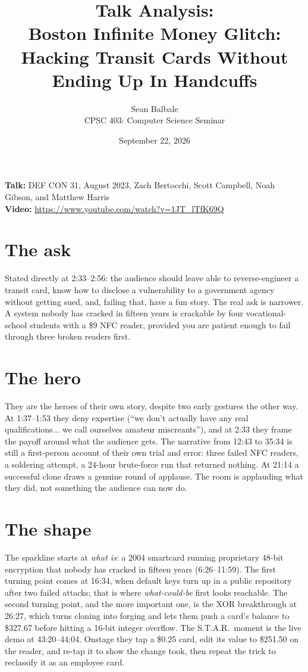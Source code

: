 \documentclass[11pt]{article}
\title{\vspace{-2em}Talk Analysis: \\ \large Boston Infinite Money Glitch: Hacking Transit Cards Without Ending Up In Handcuffs}
\author{Sean Balbale \\ CPSC 403: Computer Science Seminar}
\date{September 22, 2026}
\begin{document}
\maketitle
\vspace{-1.5em}

\noindent\textbf{Talk:} DEF CON 31, August 2023, Zach Bertocchi, Scott Campbell, Noah Gibson, and Matthew Harris \\
\textbf{Video:} \url{https://www.youtube.com/watch?v=1JT_lTfK69Q}

\section{The ask}
Stated directly at 2:33--2:56: the audience should leave able to reverse-engineer a transit card, know how to disclose a vulnerability to a government agency without getting sued, and, failing that, have a fun story. The real ask is narrower. A system nobody has cracked in fifteen years is crackable by four vocational-school students with a \$9 NFC reader, provided you are patient enough to fail through three broken readers first.

\section{The hero}
They are the heroes of their own story, despite two early gestures the other way. At 1:37--1:53 they deny expertise (``we don't actually have any real qualifications... we call ourselves amateur miscreants''), and at 2:33 they frame the payoff around what the audience gets. The narrative from 12:43 to 35:34 is still a first-person account of their own trial and error: three failed NFC readers, a soldering attempt, a 24-hour brute-force run that returned nothing. At 21:14 a successful clone draws a genuine round of applause. The room is applauding what they did, not something the audience can now do.

\section{The shape}
The sparkline starts at \emph{what is}: a 2004 smartcard running proprietary 48-bit encryption that nobody has cracked in fifteen years (6:26--11:59). The first turning point comes at 16:34, when default keys turn up in a public repository after two failed attacks; that is where \emph{what-could-be} first looks reachable. The second turning point, and the more important one, is the XOR breakthrough at 26:27, which turns cloning into forging and lets them push a card's balance to \$327.67 before hitting a 16-bit integer overflow. The S.T.A.R.\ moment is the live demo at 43:20--44:04. Onstage they tap a \$0.25 card, edit its value to \$251.50 on the reader, and re-tap it to show the change took, then repeat the trick to reclassify it as an employee card.
\end{document}
